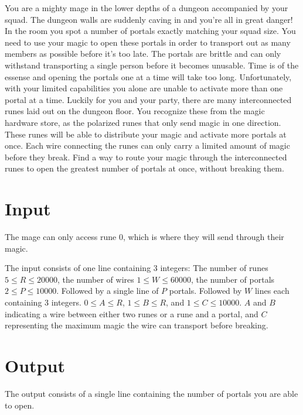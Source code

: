 
You are a mighty mage in the lower depths of a dungeon accompanied by your squad.
The dungeon walls are suddenly caving in and you're all in great danger!
In the room you spot a number of portals exactly matching your squad size.
You need to use your magic to open these portals in order to transport out as many members as possible before it's too late.
The portals are brittle and can only withstand transporting a single person before it becomes unusable.
Time is of the essense and opening the portals one at a time will take too long.
Unfortunately, with your limited capabilities you alone are unable to activate more than one portal at a time.
Luckily for you and your party, there are many interconnected runes laid out on the dungeon floor.
You recognize these from the magic hardware store, as the polarized runes that only send magic in one direction.
These runes will be able to distribute your magic and activate more portals at once.
Each wire connecting the runes can only carry a limited amount of magic before they break.
Find a way to route your magic through the interconnected runes to open the greatest number of portals at once, without breaking them.

\section*{Input}
The mage can only access rune $0$, which is where they will send through their magic.

The input consists of one line containing 3 integers:
The number of runes $5 \leq R \leq 20000$, the number of wires $1 \leq W \leq 60000$, the number of portals $2 \leq P \leq 10000$.
Followed by a single line of $P$ portals.
Followed by $W$ lines each containing 3 integers. $0 \leq A \leq R$, $1 \leq B \leq R$, and $1 \leq C \leq 10000$.
$A$ and $B$ indicating a wire between either two runes or a rune and a portal, and $C$ representing the maximum magic the wire can transport before breaking.

\section*{Output}
The output consists of a single line containing the number of portals you are able to open.
